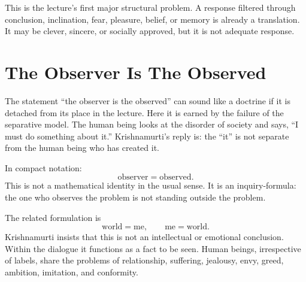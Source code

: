 \begin{figure}
\centering
{}
\end{figure}

This is the lecture's first major structural problem. A response filtered through conclusion, inclination, fear, pleasure, belief, or memory is already a translation. It may be clever, sincere, or socially approved, but it is not adequate response.

\section{The Observer Is The Observed}

The statement ``the observer is the observed'' can sound like a doctrine if it is detached from its place in the lecture. Here it is earned by the failure of the separative model. The human being looks at the disorder of society and says, ``I must do something about it.'' Krishnamurti's reply is: the ``it'' is not separate from the human being who has created it.

In compact notation:
\begin{equation}
\text{observer} = \text{observed}.
\end{equation}
This is not a mathematical identity in the usual sense. It is an inquiry-formula: the one who observes the problem is not standing outside the problem.

The related formulation is
\begin{equation}
\text{world} = \text{me},
\qquad
\text{me} = \text{world}.
\end{equation}
Krishnamurti insists that this is not an intellectual or emotional conclusion. Within the dialogue it functions as a fact to be seen. Human beings, irrespective of labels, share the problems of relationship, suffering, jealousy, envy, greed, ambition, imitation, and conformity.

